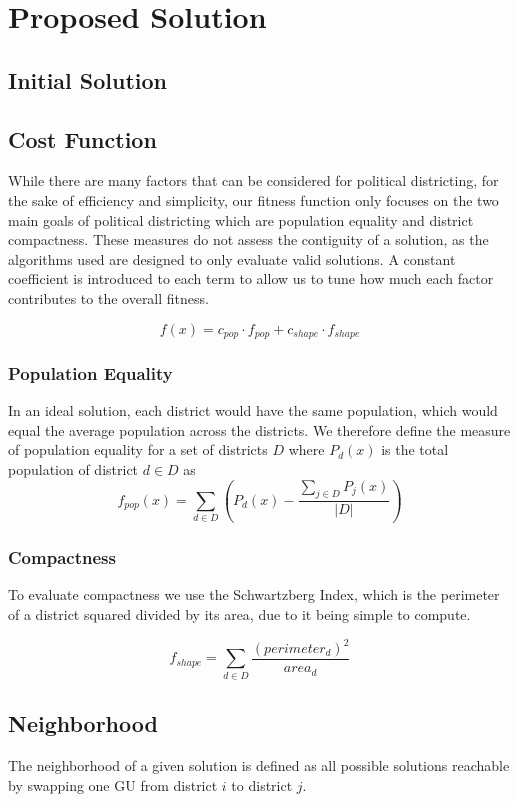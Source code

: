 \documentclass[journal]{IEEEtran}
\begin{document}
\section{Proposed Solution}
\label{sec:proposed_solution}

\subsection{Initial Solution}
\subsection{Cost Function}
While there are many factors that can be considered for political districting, for the sake of efficiency and simplicity, our fitness function only focuses on the two main goals of political districting which are population equality and district compactness.  These measures do not assess the contiguity of a solution, as the algorithms used are designed to only evaluate valid solutions.  A constant coefficient is introduced to each term to allow us to tune how much each factor contributes to the overall fitness.

$$f(x) = c_{pop} \cdot f_{pop} + c_{shape} \cdot f_{shape}$$

\subsubsection{Population Equality}
In an ideal solution, each district would have the same population, which would equal the average population across the districts.  We therefore define the measure of population equality for a set of districts $D$ where $P_d(x)$ is the total population of district $d \in D$ as
$$f_{pop}(x) = \sum_{d \in D} \left(P_d(x) - \frac{\sum_{j \in D} P_j(x)}{|D|}\right)$$

\subsubsection{Compactness}
To evaluate compactness we use the Schwartzberg Index, which is the perimeter of a district squared divided by its area, due to it being simple to compute.

$$f_{shape} = \sum_{d \in D} \frac{(perimeter_d)^2}{area_d}$$

\subsection{Neighborhood}
The neighborhood of a given solution is defined as all possible solutions reachable by swapping one GU from district $i$ to district $j$.  
\end{document}
